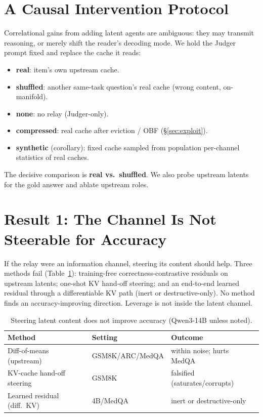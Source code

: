 \documentclass[11pt]{article}
\begin{document}
\section{A Causal Intervention Protocol}
\label{sec:protocol}
Correlational gains from adding latent agents are ambiguous: they may transmit
reasoning, or merely shift the reader's decoding mode. We hold the Judger prompt
fixed and replace the cache it reads:
\begin{itemize}\itemsep2pt
\item \textbf{real}: item's own upstream cache.
\item \textbf{shuffled}: another same-task question's real cache (wrong content,
on-manifold).
\item \textbf{none}: no relay (Judger-only).
\item \textbf{compressed}: real cache after eviction / OBF (\S\ref{sec:exploit}).
\item \textbf{synthetic} (corollary): fixed cache sampled from population
per-channel statistics of real caches.
\end{itemize}
The decisive comparison is \textbf{real vs.\ shuffled}. We also probe upstream
latents for the gold answer and ablate upstream roles.

\section{Result 1: The Channel Is Not Steerable for Accuracy}
\label{sec:steer}
If the relay were an information channel, steering its content should help. Three
methods fail (Table~\ref{tab:steer}): training-free correctness-contrastive
residuals on upstream latents; one-shot KV hand-off steering; and an end-to-end
learned residual through a differentiable KV path (inert or destructive-only).
No method finds an accuracy-improving direction. Leverage is not inside the
latent channel.

\begin{table}[t]
\centering\small
\caption{Steering latent content does not improve accuracy (Qwen3-14B unless
noted).}
\label{tab:steer}
\begin{tabular}{@{}lll@{}}
\toprule
Method & Setting & Outcome \\
\midrule
Diff-of-means (upstream) & GSM8K/ARC/MedQA & within noise; hurts MedQA \\
KV-cache hand-off steering & GSM8K & falsified (saturates/corrupts) \\
Learned residual (diff.\ KV) & 4B/MedQA & inert or destructive-only \\
\bottomrule
\end{tabular}
\end{table}
\end{document}
